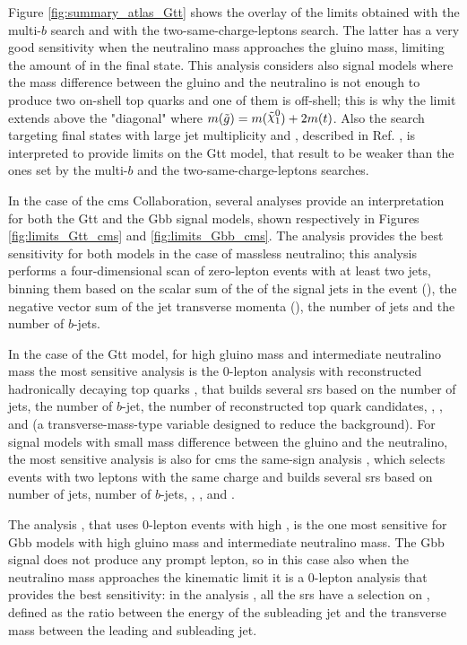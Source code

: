 Figure \ref{fig:summary_atlas_Gtt} shows the overlay of the limits obtained with the multi-$b$ search and with the two-same-charge-leptons search.
The latter has a very good sensitivity when the neutralino mass approaches the gluino mass,
limiting the amount of \met in the final state.
This analysis considers also signal models where the mass difference between the gluino and the neutralino 
is not enough to produce two on-shell top quarks and one of them is off-shell; this is why the limit extends above 
the "diagonal" where $m(\tilde{g}) = m(\ninoone) + 2 m(t)$.
Also the search targeting final states with large jet multiplicity and \met, described in Ref. \cite{SUSY-2016-13}, is interpreted to provide limits on the Gtt model, that result 
to be weaker than the ones set by the multi-$b$ and the two-same-charge-leptons searches. 

In the case of the \gls{cms} Collaboration, several analyses provide an interpretation for both the Gtt and 
the Gbb signal models, shown respectively in Figures \ref{fig:limits_Gtt_cms} and \ref{fig:limits_Gbb_cms}.
The \htmiss analysis \cite{Sirunyan:2017cwe} provides the best sensitivity for both models in the case of massless 
neutralino; this analysis performs a four-dimensional scan of zero-lepton events with at least two jets, binning them 
based on the scalar sum of the \pt of the signal jets in the event (\Ht), the negative vector sum of the jet transverse momenta (\htmiss), 
the number of jets and the number of $b$-jets. 

In the case of the Gtt model, for high gluino mass and intermediate neutralino mass the most sensitive analysis is
the 0-lepton analysis with reconstructed hadronically decaying top quarks \cite{Sirunyan:2017pjw}, 
that builds several \glspl{sr} based on the number of jets, the number of $b$-jet, the number of reconstructed top quark 
candidates, \met, \Ht, and \mttwo 
(a transverse-mass-type variable designed to reduce the \ttbar background). 
For signal models with small mass difference between the gluino and the neutralino, the most sensitive analysis 
is also for \gls{cms} the same-sign analysis \cite{Sirunyan:2017uyt}, which selects events with two leptons with 
the same charge and builds several \glspl{sr} based on number of jets, number of $b$-jets, \met, \Ht, and \mt. 

The \mttwo analysis \cite{Sirunyan:2017kqq}, that uses 0-lepton events with high \mttwo,
 is the one most sensitive for Gbb models with high gluino mass 
and intermediate neutralino mass. 
The Gbb signal does not produce any prompt lepton, so in this case also when the neutralino mass approaches the kinematic 
limit it is a 0-lepton analysis that provides the best sensitivity: 
in the \alphat analysis \cite{Sirunyan:2018vjp}, all the \glspl{sr} 
have a selection on \alphat, defined as the ratio between the energy of the subleading jet and the transverse mass
between the leading and subleading jet. 

